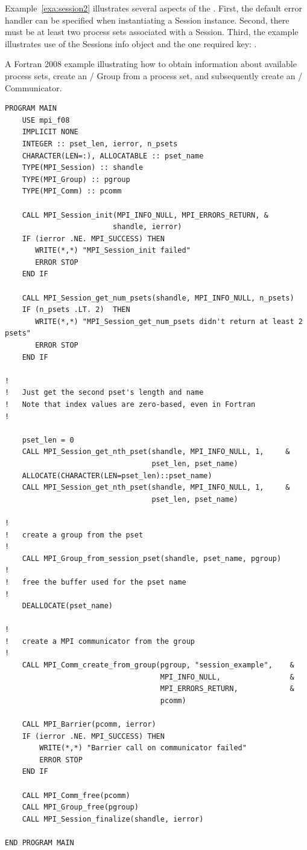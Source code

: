 Example~\ref{exa:session2} illustrates several aspects of the \spm{}. First, the default error handler
can be specified when instantiating a Session instance.  Second, there must be at least two process sets
associated with a Session.  Third, the example illustrates use of the Sessions info object and the
one required key: .


\begin{example}
A Fortran 2008 example illustrating how to obtain information about available process sets, create an \MPI/ Group
from a process set, and subsequently create an \MPI/ Communicator.
\label{exa:session3}
%
\begin{lstlisting}[language={[MPI08withlen]Fortran},basicstyle=\lstsmall]
PROGRAM MAIN
    USE mpi_f08
    IMPLICIT NONE
    INTEGER :: pset_len, ierror, n_psets
    CHARACTER(LEN=:), ALLOCATABLE :: pset_name
    TYPE(MPI_Session) :: shandle
    TYPE(MPI_Group) :: pgroup
    TYPE(MPI_Comm) :: pcomm

    CALL MPI_Session_init(MPI_INFO_NULL, MPI_ERRORS_RETURN, &
                         shandle, ierror)
    IF (ierror .NE. MPI_SUCCESS) THEN
       WRITE(*,*) "MPI_Session_init failed"
       ERROR STOP
    END IF

    CALL MPI_Session_get_num_psets(shandle, MPI_INFO_NULL, n_psets)
    IF (n_psets .LT. 2)  THEN
       WRITE(*,*) "MPI_Session_get_num_psets didn't return at least 2 psets"
       ERROR STOP
    END IF

!
!   Just get the second pset's length and name
!   Note that index values are zero-based, even in Fortran
!

    pset_len = 0
    CALL MPI_Session_get_nth_pset(shandle, MPI_INFO_NULL, 1,     &
                                  pset_len, pset_name)
    ALLOCATE(CHARACTER(LEN=pset_len)::pset_name)
    CALL MPI_Session_get_nth_pset(shandle, MPI_INFO_NULL, 1,     &
                                  pset_len, pset_name)

!
!   create a group from the pset
!
    CALL MPI_Group_from_session_pset(shandle, pset_name, pgroup)
!
!   free the buffer used for the pset name
!
    DEALLOCATE(pset_name)

!
!   create a MPI communicator from the group
!
    CALL MPI_Comm_create_from_group(pgroup, "session_example",    &
                                    MPI_INFO_NULL,                &
                                    MPI_ERRORS_RETURN,            &
                                    pcomm)

    CALL MPI_Barrier(pcomm, ierror)
    IF (ierror .NE. MPI_SUCCESS) THEN
        WRITE(*,*) "Barrier call on communicator failed"
        ERROR STOP
    END IF

    CALL MPI_Comm_free(pcomm)
    CALL MPI_Group_free(pgroup)
    CALL MPI_Session_finalize(shandle, ierror)

END PROGRAM MAIN
\end{lstlisting}
\end{example}

